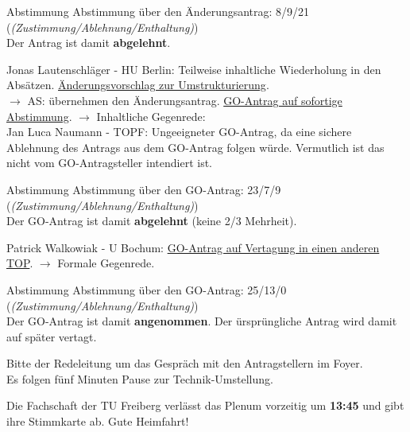     \begin{danger}{Abstimmung}
      Abstimmung über den Änderungsantrag: 8/9/21 (\textit{(Zustimmung/Ablehnung/Enthaltung)}) \\
      Der Antrag ist damit \textbf{abgelehnt}.
    \end{danger}

    \begin{outline}
      \1 Jonas Lautenschläger - HU Berlin:  Teilweise inhaltliche Wiederholung in den Absätzen. \underline{Änderungsvorschlag zur Umstrukturierung}. \\
      $\rightarrow$ AS: übernehmen den Änderungsantrag.
      \1 \underline{GO-Antrag auf sofortige Abstimmung}. $\rightarrow$ Inhaltliche Gegenrede: \\
        Jan Luca Naumann - TOPF:  Ungeeigneter GO-Antrag, da eine sichere Ablehnung des Antrags aus dem GO-Antrag folgen würde. Vermutlich ist das nicht vom GO-Antragsteller intendiert ist.
    \end{outline}

    \begin{danger}{Abstimmung}
      Abstimmung über den GO-Antrag: 23/7/9 (\textit{(Zustimmung/Ablehnung/Enthaltung)}) \\
      Der GO-Antrag ist damit \textbf{abgelehnt} (keine 2/3 Mehrheit).
    \end{danger}

    \begin{outline}
      \1 Patrick Walkowiak - U Bochum:  \underline{GO-Antrag auf Vertagung in einen anderen TOP}. $\rightarrow$ Formale Gegenrede.
    \end{outline}

    \begin{success}{Abstimmung}
      Abstimmung über den GO-Antrag: 25/13/0 (\textit{(Zustimmung/Ablehnung/Enthaltung)}) \\
      Der GO-Antrag ist damit \textbf{angenommen}. Der ürsprüngliche Antrag wird damit auf später vertagt.
    \end{success}

    Bitte der Redeleitung um das Gespräch mit den Antragstellern im Foyer. \\
    Es folgen fünf Minuten Pause zur Technik-Umstellung.

    \begin{info}{}
      Die Fachschaft der TU Freiberg verlässt das Plenum vorzeitig um \textbf{13:45} und gibt ihre Stimmkarte ab. Gute Heimfahrt!
    \end{info}

